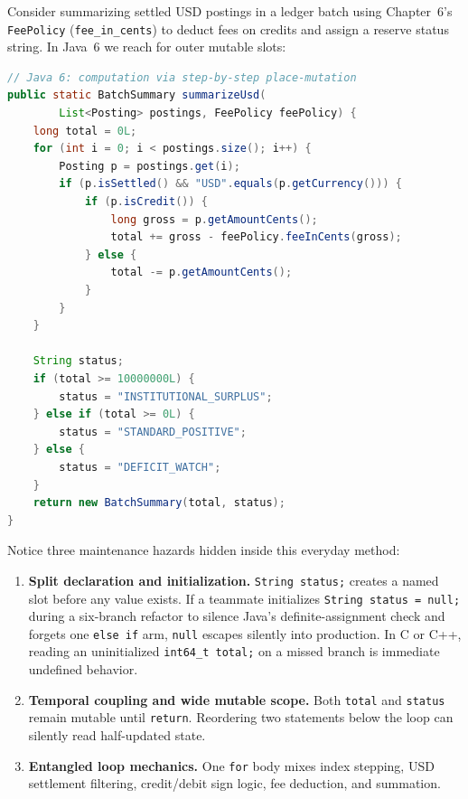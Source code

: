 Consider summarizing settled USD postings in a ledger batch using Chapter~6's
\texttt{FeePolicy} (\texttt{fee\_\allowbreak{}in\_\allowbreak{}cents}) to deduct fees on credits and assign a
reserve status string. In Java~6 we reach for outer mutable slots:

\begin{lstlisting}[language=Java]
// Java 6: computation via step-by-step place-mutation
public static BatchSummary summarizeUsd(
        List<Posting> postings, FeePolicy feePolicy) {
    long total = 0L;
    for (int i = 0; i < postings.size(); i++) {
        Posting p = postings.get(i);
        if (p.isSettled() && "USD".equals(p.getCurrency())) {
            if (p.isCredit()) {
                long gross = p.getAmountCents();
                total += gross - feePolicy.feeInCents(gross);
            } else {
                total -= p.getAmountCents();
            }
        }
    }

    String status;
    if (total >= 10000000L) {
        status = "INSTITUTIONAL_SURPLUS";
    } else if (total >= 0L) {
        status = "STANDARD_POSITIVE";
    } else {
        status = "DEFICIT_WATCH";
    }
    return new BatchSummary(total, status);
}
\end{lstlisting}

Notice three maintenance hazards hidden inside this everyday method:
\begin{enumerate}
  \item \textbf{Split declaration and initialization.} \texttt{String status;} creates
    a named slot before any value exists. If a teammate initializes
    \texttt{String status = null;} during a six-branch refactor to silence Java's
    definite-assignment check and forgets one \texttt{else if} arm, \texttt{null}
    escapes silently into production. In C or C++, reading an uninitialized
    \texttt{int64\_t total;} on a missed branch is immediate undefined behavior.
  \item \textbf{Temporal coupling and wide mutable scope.} Both \texttt{total} and
    \texttt{status} remain mutable until \texttt{return}. Reordering two statements
    below the loop can silently read half-updated state.
  \item \textbf{Entangled loop mechanics.} One \texttt{for} body mixes index stepping,
    USD settlement filtering, credit/debit sign logic, fee deduction, and summation.
\end{enumerate}


